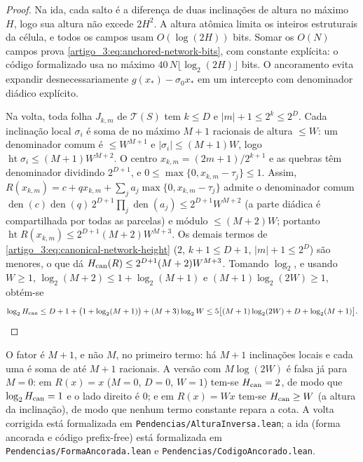 \begin{proof}
Na ida, cada salto é a diferença de duas inclinações de altura no máximo
$H$, logo sua altura não excede $2H^2$. A altura atômica limita os inteiros
estruturais da célula, e todos os campos usam $O(\log(2H))$ bits. Somar os
$O(N)$ campos prova \eqref{artigo_3:eq:anchored-network-bits}, com constante explícita:
o código formalizado usa no máximo $40\,N\lfloor\log_2(2H)\rfloor$ bits. O ancoramento evita
expandir desnecessariamente $g(x_*)-\sigma_0x_*$ em um intercepto com
denominador diádico explícito.

Na volta, toda folha $J_{k,m}$ de $\mathcal T(S)$ tem $k\le D$ e
$|m|+1\le 2^k\le 2^D$. Cada inclinação local $\sigma_i$ é soma de no máximo $M+1$
racionais de altura $\le W$: um denominador comum é $\le W^{M+1}$ e
$|\sigma_i|\le(M+1)W$, logo $\operatorname{ht}\sigma_i\le (M+1)W^{M+2}$. O centro
$x_{k,m}=(2m+1)/2^{k+1}$ e as quebras têm denominador dividindo $2^{D+1}$, e
$0\le \max\{0,x_{k,m}-\tau_j\}\le1$. Assim, $R(x_{k,m})=c+qx_{k,m}+\sum_j
a_j\max\{0,x_{k,m}-\tau_j\}$ admite o denominador comum
$\operatorname{den}(c)\operatorname{den}(q)\,2^{D+1}\prod_j\operatorname{den}(a_j)\le
2^{D+1}W^{M+2}$ (a parte diádica é compartilhada por todas as parcelas) e módulo
$\le (M+2)W$; portanto $\operatorname{ht}R(x_{k,m})\le 2^{D+1}(M+2)W^{M+3}$. Os
demais termos de \eqref{artigo_3:eq:canonical-network-height} ($2$, $k+1\le D+1$,
$|m|+1\le 2^D$) são menores, o que dá $H_{\rm can}(R)\le 2^{D+1}(M+2)W^{M+3}$.
Tomando $\log_2$, e usando $W\ge1$, $\log_2(M+2)\le 1+\log_2(M+1)$ e
$(M+1)\log_2(2W)\ge1$, obtém-se
\[
 \log_2 H_{\rm can}\le D+1+\bigl(1+\log_2(M+1)\bigr)+(M+3)\log_2 W
 \le 5\bigl[(M+1)\log_2(2W)+D+\log_2(M+1)\bigr].
\]
\end{proof}

\begin{observacaoSN}\label{artigo_3:rem:reverse-height-correction}
O fator é $M+1$, e não $M$, no primeiro termo: há $M+1$ inclinações locais e
cada uma é soma de até $M+1$ racionais. A versão com $M\log(2W)$ é falsa já para
$M=0$: em $R(x)=x$ ($M=0$, $D=0$, $W=1$) tem-se $H_{\rm can}=2$, de modo que
$\log_2 H_{\rm can}=1$ e o lado direito é $0$; e em $R(x)=Wx$ tem-se
$H_{\rm can}\ge W$ (a altura da inclinação), de modo que nenhum termo constante
repara a cota. A volta corrigida está formalizada em
\texttt{Pendencias/AlturaInversa.lean}; a ida (forma ancorada e código prefix-free)
está formalizada em \texttt{Pendencias/FormaAncorada.lean} e
\texttt{Pendencias/CodigoAncorado.lean}.
\end{observacaoSN}

